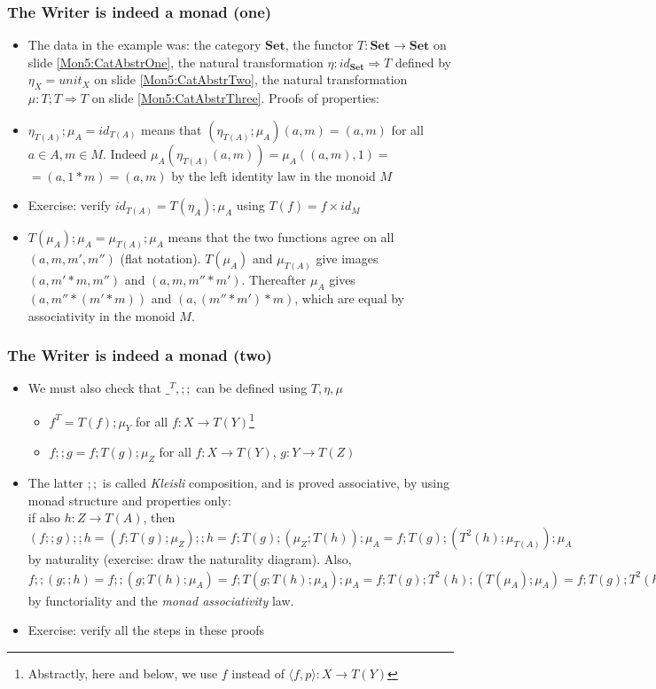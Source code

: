 \documentclass[handout]{beamer}
\newcommand{\To}{\Rightarrow}
\newcommand{\bfsf}[1]{{\boldsymbol{#1}}}
\newcommand{\Set}{\bfsf{Set}}
\newcommand{\Kp}[1]{{\langle #1 \rangle}}
\newcommand{\Kc}{;\!;}
\begin{document}
\frame
  {   
    \frametitle{The Writer is indeed a monad (one)}\label{Mon5:ExaMonadOne}

 \begin{itemize}[<+->]
\item The data in the example was: the category $\Set$, 
the functor $T:\Set\to\Set$ on slide \ref{Mon5:CatAbstrOne}, 
the natural transformation $\eta: id_\Set\To T$
defined by $\eta_X = unit_X$ on slide \ref{Mon5:CatAbstrTwo}, 
the natural transformation $\mu: T;T \To T$
on slide \ref{Mon5:CatAbstrThree}. Proofs of properties:
\item $\eta_{T(A)};\mu_A = id_{T(A)}$ means that  $(\eta_{T(A)};\mu_A)(a,m) = (a,m)$
for all $a\in A, m\in M$. Indeed $\mu_A(\eta_{T(A)}(a,m)) = \mu_A((a,m),1) =$ $= (a,1*m) = (a,m)$
by the left identity law in the monoid $M$
\item Exercise: verify  $id_{T(A)} = T(\eta_A);\mu_A$ using $T(f) = f\times id_M$
\item $T(\mu_A);\mu_A = \mu_{T(A)};\mu_A$ means that the two functions agree
on all $(a,m,m',m'')$ (flat notation). $T(\mu_A)$ and $\mu_{T(A)}$ give images $(a,m'*m,m'')$ and $(a,m,m''*m')$. Thereafter $\mu_A$ gives $(a,m''*(m'*m))$ and $(a,(m''*m')*m)$, which are equal by associativity in the monoid $M$.
 \end{itemize}

 }

\frame
  {   
    \frametitle{The Writer is indeed a monad (two)}\label{Mon5:ExaMonadTwo}

 \begin{itemize}[<+->]
\item We must also check that $\_^T, \Kc$ can be defined using $T,\eta,\mu$
 \begin{itemize}
\item $f^T = T(f);\mu_Y$ for all $f: X\to T(Y)$\footnote{Abstractly, here and below,
we use $f$ instead of $\Kp{f,p}:X\to T(Y)$}
\item $f \Kc  g = f ;T(g);\mu_Z$ for all $f: X\to T(Y)$, $g: Y\to T(Z)$
 \end{itemize}
\item The latter $\Kc$ is called \emph{Kleisli} composition, and is proved
associative, by using monad structure and properties only:\\
if also $h: Z\to T(A)$, then
$(f \Kc g) \Kc h = (f ;T(g);\mu_Z) \Kc h = f ;T(g);(\mu_Z; T(h)) ; \mu_A =
f ;T(g);(T^2(h);\mu_{T(A)}) ; \mu_A$ by naturality (exercise: draw the naturality diagram). 
Also, $f \Kc (g \Kc h) = f \Kc (g;T(h);\mu_A) = f; T(g;T(h);\mu_A);\mu_A =
f; T(g);T^2(h);(T(\mu_A);\mu_A) = f; T(g);T^2(h);(\mu_{T(A)};\mu_A)$
by functoriality and the \emph{monad associativity} law.

\item Exercise: verify all the steps in these proofs
 \end{itemize}

 }
\end{document}
